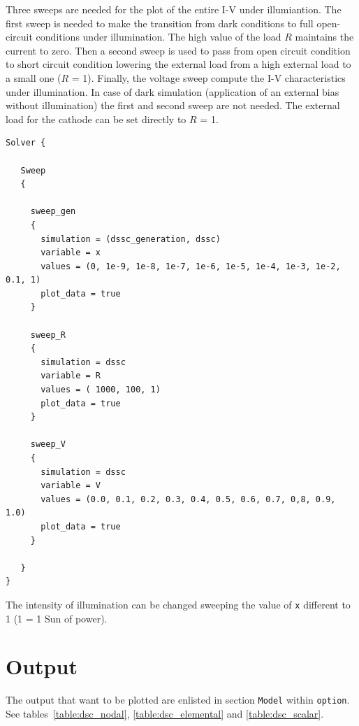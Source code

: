 Three sweeps are needed for the plot of the entire I-V under
illumiantion. The first sweep is needed to make the transition
from dark conditions to full open-circuit conditions under
illumination. The high value of the load $R$ maintains the current
to zero. Then a second sweep is used to pass from open circuit
condition to short circuit condition lowering the external load
from a high external load to a small one ($R$ = 1). Finally, the
voltage sweep compute the I-V characteristics under illumination.
In case of dark simulation (application of an external bias
without illumination) the first and second sweep are not needed.
The external load for the cathode can be set directly to $R$ = 1.
\begin{verbatim}
Solver {

   Sweep
   {

     sweep_gen
     {
       simulation = (dssc_generation, dssc)
       variable = x
       values = (0, 1e-9, 1e-8, 1e-7, 1e-6, 1e-5, 1e-4, 1e-3, 1e-2, 0.1, 1)
       plot_data = true
     }

     sweep_R
     {
       simulation = dssc
       variable = R
       values = ( 1000, 100, 1)
       plot_data = true
     }

     sweep_V
     {
       simulation = dssc
       variable = V
       values = (0.0, 0.1, 0.2, 0.3, 0.4, 0.5, 0.6, 0.7, 0,8, 0.9, 1.0)
       plot_data = true
     }

   }
}
\end{verbatim}
The intensity of illumination can be changed sweeping the value of
\texttt{x} different to 1 (1 = 1 Sun of power).


\section{Output}

The output that want to be plotted are enlisted in section
\texttt{Model} within \texttt{option}. See
tables~\ref{table:dsc_nodal}, \ref{table:dsc_elemental} and
\ref{table:dsc_scalar}.

